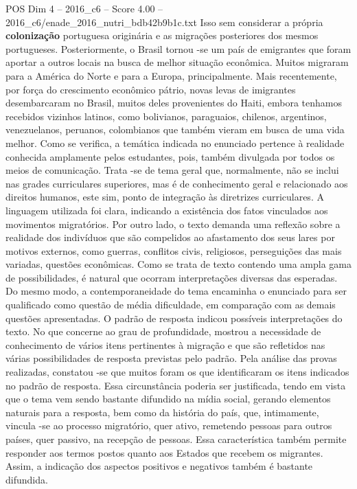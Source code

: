 \begin{textsample}{POS Dim 4 – 2016\_c6 – Score 4.00 – 2016\_c6/enade\_2016\_nutri\_bdb42b9b1c.txt}
Isso sem considerar a própria \textbf{colonização} portuguesa originária e as migrações posteriores dos mesmos portugueses.
Posteriormente, o Brasil tornou -se um país de emigrantes que foram aportar a outros locais na busca de melhor situação econômica.
Muitos migraram para a América do Norte e para a Europa, principalmente.
Mais recentemente, por força do crescimento econômico pátrio, novas levas de imigrantes desembarcaram no Brasil, muitos deles provenientes do Haiti, embora tenhamos recebidos vizinhos latinos, como bolivianos, paraguaios, chilenos, argentinos, venezuelanos, peruanos, colombianos que também vieram em busca de uma vida melhor.
Como se verifica, a temática indicada no enunciado pertence à realidade conhecida amplamente pelos estudantes, pois, também divulgada por todos os meios de comunicação.
Trata -se de tema geral que, normalmente, não se inclui nas grades curriculares superiores, mas é de conhecimento geral e relacionado aos direitos humanos, este sim, ponto de integração às diretrizes curriculares.
A linguagem utilizada foi clara, indicando a existência dos fatos vinculados aos movimentos migratórios.
Por outro lado, o texto demanda uma reflexão sobre a realidade dos indivíduos que são compelidos ao afastamento dos seus lares por motivos externos, como guerras, conflitos civis, religiosos, perseguições das mais variadas, questões econômicas.
Como se trata de texto contendo uma ampla gama de possibilidades, é natural que ocorram interpretações diversas das esperadas.
Do mesmo modo, a contemporaneidade do tema encaminha o enunciado para ser qualificado como questão de média dificuldade, em comparação com as demais questões apresentadas.
O padrão de resposta indicou possíveis interpretações do texto.
No que concerne ao grau de profundidade, mostrou a necessidade de conhecimento de vários itens pertinentes à migração e que são refletidos nas várias possibilidades de resposta previstas pelo padrão.
Pela análise das provas realizadas, constatou -se que muitos foram os que identificaram os itens indicados no padrão de resposta.
Essa circunstância poderia ser justificada, tendo em vista que o tema vem sendo bastante difundido na mídia social, gerando elementos naturais para a resposta, bem como da história do país, que, intimamente, vincula -se ao processo migratório, quer ativo, remetendo pessoas para outros países, quer passivo, na recepção de pessoas.
Essa característica também permite responder aos termos postos quanto aos Estados que recebem os migrantes.
Assim, a indicação dos aspectos positivos e negativos também é bastante difundida.

\end{textsample}
